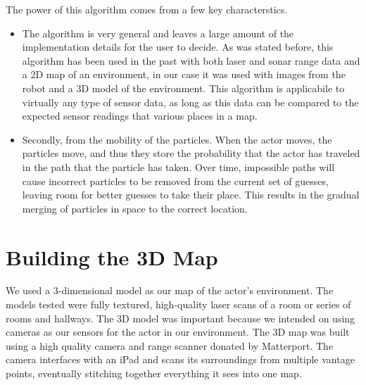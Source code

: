 \documentclass[a4paper,11pt]{article}
\begin{document}
The power of this algorithm comes from a few key characterstics. 
\begin{itemize}
 \item The algorithm is very general and leaves a large amount of the implementation details for the user to decide. As was stated before, this algorithm has been used in the past with both laser and sonar range data and a 2D map of an environment, in our case it was used with images from the robot and a 3D model of the environment. This algorithm is applicabile to virtually any type of sensor data, as long as this data can be compared to the expected sensor readings that various places in a map. 
 \item Secondly, from the mobility of the particles. When the actor moves, the particles move, and thus they store the probability that the actor has traveled in the path that the particle has taken. Over time, impossible paths will cause incorrect particles to be removed from the current set of guesses, leaving room for better guesses to take their place. This results in the gradual merging of particles in space to the correct location.
\end{itemize}

\newpage

  \section{Building the 3D Map}
  We used a 3-dimensional model as our map of the actor's environment. The models tested were fully textured, high-quality laser scans of a room or series of rooms and hallways. The 3D model was important because we intended on using cameras as our sensors for the actor in our environment. The 3D map was built using a high quality camera and range scanner donated by Matterport. The camera interfaces with an iPad and scans its surroundings from multiple vantage points, eventually stitching together everything it sees into one map. %
  
\end{document}
